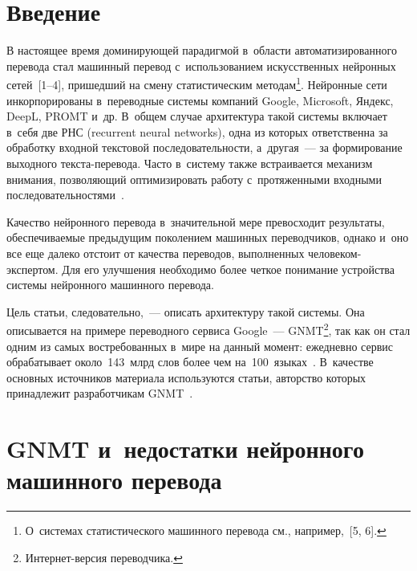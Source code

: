   



\thispagestyle{headings}

\begin{multicols}{2}

\label{st\stat}
  
  \section{Введение}
  
  В настоящее время доминирующей парадигмой в~области 
автоматизированного перевода стал машинный перевод с~использованием 
искусственных нейронных сетей~[1--4], пришедший на смену статистическим 
методам\footnote[2]{О~системах статистического машинного перевода см., например,~[5, 6].}. 
Нейронные сети инкорпорированы в~переводные системы компаний Google, 
Microsoft, Яндекс, DeepL, PROMT и~др. В~общем случае архитектура такой 
системы включает в~себя две РНС (recurrent neural 
networks), одна из которых ответственна за обработку входной текстовой 
последовательности, а~другая~--- за формирование выходного текс\-та-пе\-ре\-во\-да. 
Часто в~систему также встраивается механизм внимания, позволяющий 
оптимизировать работу с~протяженными входными 
последовательностями~\cite{1-nur, 7-nur}. 

Качество нейронного перевода 
в~значительной мере превосходит результаты, обес\-пе\-чи\-ва\-емые предыду\-щим 
поколением машинных пе\-ре\-вод\-чиков, однако и~оно все еще далеко отстоит от 
качества переводов, выполненных че\-ло\-ве\-ком-экс\-пер\-том. Для его улучшения 
необходимо более четкое понимание устройства системы нейронного 
машинного перевода.
  
  Цель статьи, следовательно,~--- описать архитектуру такой системы. Она 
описывается на примере переводного сервиса Google~--- 
GNMT\footnote[3]{Интернет-версия переводчика.}, так как он стал одним из самых востребованных в~мире на 
данный момент: ежедневно сервис обрабатывает около~143~млрд слов 
более чем на~100~языках~\cite{8-nur}. В~качестве основных источников 
материала используются статьи, авторство которых принадлежит 
разработчикам GNMT~\cite{9-nur, 10-nur}.
  
  \section{GNMT и~недостатки нейронного машинного перевода}
  

\end{multicols}

